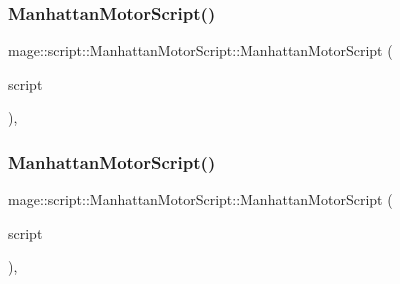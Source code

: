 \subsubsection{\texorpdfstring{Manhattan\+Motor\+Script()}{ManhattanMotorScript()}\hspace{0.1cm}{\footnotesize\ttfamily [2/3]}}
{\footnotesize\ttfamily mage\+::script\+::\+Manhattan\+Motor\+Script\+::\+Manhattan\+Motor\+Script (\begin{DoxyParamCaption}\item[{const \hyperlink{classmage_1_1script_1_1_manhattan_motor_script}{Manhattan\+Motor\+Script} \&}]{script }\end{DoxyParamCaption})\hspace{0.3cm}{\ttfamily [default]}, {\ttfamily [noexcept]}}

\hypertarget{classmage_1_1script_1_1_manhattan_motor_script_a62843ba8d660b496bec036082a0867f6}{}\label{classmage_1_1script_1_1_manhattan_motor_script_a62843ba8d660b496bec036082a0867f6} 
\subsubsection{\texorpdfstring{Manhattan\+Motor\+Script()}{ManhattanMotorScript()}\hspace{0.1cm}{\footnotesize\ttfamily [3/3]}}
{\footnotesize\ttfamily mage\+::script\+::\+Manhattan\+Motor\+Script\+::\+Manhattan\+Motor\+Script (\begin{DoxyParamCaption}\item[{\hyperlink{classmage_1_1script_1_1_manhattan_motor_script}{Manhattan\+Motor\+Script} \&\&}]{script }\end{DoxyParamCaption})\hspace{0.3cm}{\ttfamily [default]}, {\ttfamily [noexcept]}}

\hypertarget{classmage_1_1script_1_1_manhattan_motor_script_aca76d9d5be76b048ec247e93e4a89adb}{}\label{classmage_1_1script_1_1_manhattan_motor_script_aca76d9d5be76b048ec247e93e4a89adb} 
